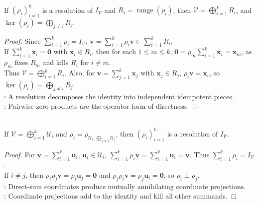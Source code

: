 \begin{theorem} \label{thm:resolution-of-identity-gives-direct-sum} \\
If $(\rho_i)_{i=1}^{k}$ is a resolution of $I_{\mathcal{V}}$ and $R_i=\operatorname{range}(\rho_i)$, then $\mathcal{V}=\bigoplus\limits_{i=1}^{k}R_i$, and $\ker(\rho_i)=\bigoplus\limits_{j\neq i}R_j$.
\begin{proof}
Since $\sum\limits_{i=1}^{k}\rho_i=I_{\mathcal{V}}$, $\mathbf{v}=\sum\limits_{i=1}^{k}\rho_i\mathbf{v}\in\sum\limits_{i=1}^{k}R_i$.\\
If $\sum\limits_{i=1}^{k}\mathbf{x}_i=\mathbf{0}$ with $\mathbf{x}_i\in R_i$, then for each $1\leq m\leq k$, $\mathbf{0}=\rho_m\sum\limits_{i=1}^{k}\mathbf{x}_i=\mathbf{x}_m$, as $\rho_m$ fixes $R_m$ and kills $R_i$ for $i\neq m$.\\
Thus $\mathcal{V}=\bigoplus\limits_{i=1}^{k}R_i$. Also, for $\mathbf{v}=\sum\limits_{j=1}^{k}\mathbf{x}_j$ with $\mathbf{x}_j\in R_j$, $\rho_i\mathbf{v}=\mathbf{x}_i$, so $\ker(\rho_i)=\bigoplus\limits_{j\neq i}R_j$.\\
: A resolution decomposes the identity into independent idempotent pieces.\\
: Pairwise zero products are the operator form of directness.
\end{proof}
\end{theorem}

\begin{theorem} \label{thm:direct-sum-gives-resolution-of-identity} \\
If $\mathcal{V}=\bigoplus_{i=1}^{k}\mathcal{U}_i$ and $\rho_i=\rho_{\mathcal{U}_i,\bigoplus_{j\neq i}\mathcal{U}_j}$, then $(\rho_i)_{i=1}^{k}$ is a resolution of $I_{\mathcal{V}}$.
\begin{proof}
For $\mathbf{v}=\sum_{i=1}^{k}\mathbf{u}_i$, $\mathbf{u}_i\in\mathcal{U}_i$, $\sum\limits_{i=1}^{k}\rho_i\mathbf{v} =\sum\limits_{i=1}^{k}\mathbf{u}_i =\mathbf{v}$. Thus $\sum\limits_{i=1}^{k}\rho_i=I_{\mathcal{V}}$.\\
If $i\neq j$, then $\rho_i\rho_j\mathbf{v}=\rho_i\mathbf{u}_j=\mathbf{0}$ and $\rho_j\rho_i\mathbf{v}=\rho_j\mathbf{u}_i=\mathbf{0}$, so $\rho_i\perp\rho_j$.\\
: Direct-sum coordinates produce mutually annihilating coordinate projections.\\
: Coordinate projections add to the identity and kill all other summands.
\end{proof}
\end{theorem}

